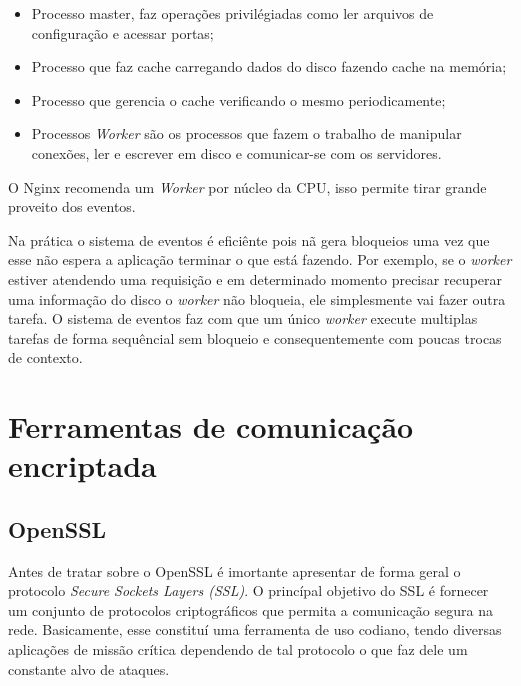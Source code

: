 \begin{itemize}
  \item Processo master, faz operações privilégiadas como ler arquivos de configuração e acessar portas;
  \item Processo que faz cache carregando dados do disco fazendo cache na memória;
  \item Processo que gerencia o cache verificando o mesmo periodicamente;
  \item Processos \textit{Worker} são os processos que fazem o trabalho de manipular conexões, ler e escrever em disco e comunicar-se com os servidores.
\end{itemize}

O Nginx recomenda um \textit{Worker} por núcleo da CPU, isso permite tirar grande proveito dos eventos.

Na prática o sistema de eventos é eficiênte pois nã gera bloqueios uma vez que esse não espera a aplicação terminar o que está fazendo. Por exemplo, se o \textit{worker} estiver atendendo uma requisição e em determinado momento precisar recuperar uma informação do disco o \textit{worker} não bloqueia, ele simplesmente vai fazer outra tarefa. O sistema de eventos faz com que um único \textit{worker} execute multiplas tarefas de forma sequêncial sem bloqueio e consequentemente com poucas trocas de contexto.

\section{Ferramentas de comunicação encriptada}


\subsection{OpenSSL}

Antes de tratar sobre o OpenSSL é imortante apresentar de forma geral o protocolo \textit{Secure Sockets Layers (SSL)}. O princípal objetivo do SSL é fornecer um conjunto de protocolos criptográficos que permita a comunicação segura na rede. Basicamente, esse constituí uma ferramenta de uso codiano, tendo diversas aplicações de missão crítica dependendo de tal protocolo o que faz dele um constante alvo de ataques.

